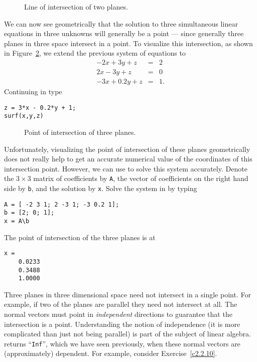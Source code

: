 \begin{figure}[htb]
              \centerline{%
              }
              \caption{Line of intersection of two planes.}
              \label{F:p2int}
\end{figure}

We can now see geometrically that the solution to three
simultaneous linear equations in three unknowns will generally
be a point --- since generally three planes in three space
intersect in a point.  To visualize this intersection, as shown in
Figure~\ref{F:p3int}, we extend the previous system of equations to
\begin{eqnarray*}
-2x +   3y + z & = & 2 \\
 2x -   3y + z & = & 0\\
-3x + 0.2y + z & = & 1.
\end{eqnarray*}
Continuing in \Matlab type
\begin{verbatim}
z = 3*x - 0.2*y + 1;
surf(x,y,z)
\end{verbatim}

\begin{figure}[htb]
              \centerline{%
              }
              \caption{Point of intersection of three planes.}
              \label{F:p3int}
\end{figure}

Unfortunately, visualizing the point of intersection of these
planes geometrically does not really help to get an accurate
numerical value of the coordinates of this intersection point.  
However, we can use \Matlab to solve this system accurately.
Denote the $3\times 3$ matrix of coefficients by {\tt A}, the 
vector of coefficients on the right hand side by {\tt b}, and 
the solution by {\tt x}.  Solve the system in \Matlab by typing
\begin{verbatim}
A = [ -2 3 1; 2 -3 1; -3 0.2 1];
b = [2; 0; 1];
x = A\b
\end{verbatim}
The point of intersection of the three planes is at
\begin{verbatim}
x =
    0.0233
    0.3488
    1.0000
\end{verbatim}

Three planes in three dimensional space need not intersect in a
single point.  For example, if two of the planes are parallel
they need not intersect at all.  The normal vectors must point
in {\em independent\/} directions to
guarantee that the intersection is a point.  Understanding the
notion of independence (it is more complicated than just not
being parallel) is part of the subject of linear algebra.
\Matlab returns ``{\tt Inf}'', which we have seen previously,
when these normal vectors are (approximately) dependent. For
example, consider Exercise~\ref{c2.2.10}.

